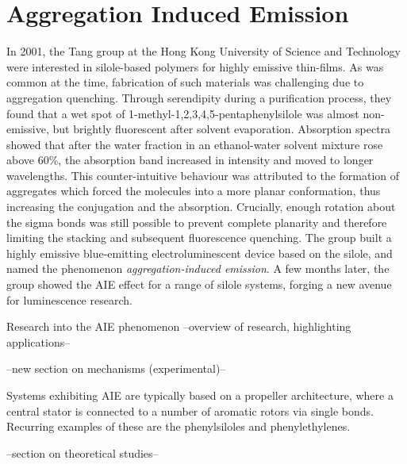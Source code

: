 \section{Aggregation Induced Emission}\label{section: lom AIE}
In 2001, the Tang group at the Hong Kong University of Science and Technology were interested in silole-based polymers for highly emissive thin-films. As was common at the time, fabrication of such materials was challenging due to aggregation quenching. Through serendipity during a purification process, they found that a wet spot of 1-methyl-1,2,3,4,5-pentaphenylsilole was almost non-emissive, but brightly fluorescent after solvent evaporation.\cite{Luo2001} Absorption spectra showed that after the water fraction in an ethanol-water solvent mixture rose above 60\%, the absorption band increased in intensity and moved to longer wavelengths. This counter-intuitive behaviour was attributed to the formation of aggregates which forced the molecules into a more planar conformation, thus increasing the conjugation and the absorption. Crucially, enough rotation about the sigma bonds was still possible to prevent complete planarity and therefore limiting the stacking and subsequent fluorescence quenching. The group built a highly emissive blue-emitting electroluminescent device based on the silole, and named the phenomenon \textit{aggregation-induced emission}. A few months later, the group showed the AIE effect for a range of silole systems, forging a new avenue for luminescence research.\cite{Tang2001}

Research into the AIE phenomenon --overview of research, highlighting applications--

--new section on mechanisms (experimental)-- 

Systems exhibiting AIE are typically based on a propeller architecture, where a central stator is connected to a number of aromatic rotors via single bonds. Recurring examples of these are the phenylsiloles and phenylethylenes.\cite{Mei2015,Hong2009,Mei2014}


--section on theoretical studies--
